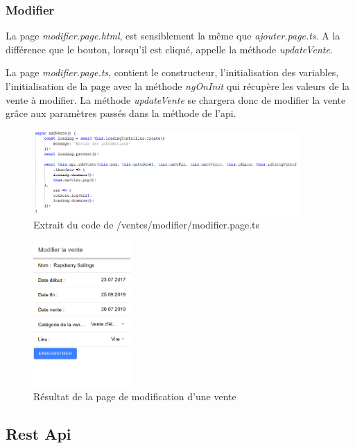 			\subsubsection{Modifier}

			La page \textit{modifier.page.html}, est sensiblement la même que \textit{ajouter.page.ts}. A la différence que le bouton, lorsqu'il est cliqué, appelle la méthode \textit{updateVente}.

			La page \textit{modifier.page.ts}, contient le constructeur, l'initialisation des variables, l'initialisation de la page avec la méthode \textit{ngOnInit} qui récupère les valeurs de la vente à modifier.\newline
			La méthode \textit{updateVente} se chargera donc de modifier la vente grâce aux paramètres passés dans la méthode de l'api.

			\begin{figure}[H]
				\centering\includegraphics[width=0.9\textwidth, keepaspectratio]{res/ajouterTs.png}
				\caption{Extrait du code de /ventes/modifier/modifier.page.ts}
			\end{figure}

			\begin{figure}[H]
				\centering\includegraphics[width=0.33\textwidth, keepaspectratio]{res/modifierVente.png}
				\caption{Résultat de la page de modification d'une vente}
			\end{figure}

		\subsection{Rest Api}

